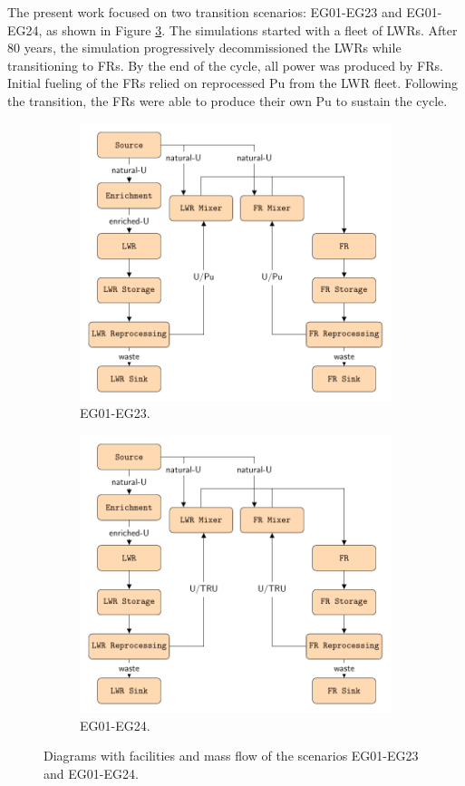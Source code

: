 \documentclass[11pt,letterpaper]{article}
\begin{document}
The present work focused on two transition scenarios: EG01-EG23 and EG01-EG24,  as shown in Figure \ref{fig:flow}. The simulations started with a fleet of LWRs. After 80 years, the simulation progressively decommissioned the LWRs while transitioning to FRs. By the end of the cycle, all power was produced by FRs. Initial fueling of the FRs relied on reprocessed Pu from the LWR fleet. Following the transition, the FRs were able to produce their own Pu to sustain the cycle.

\begin{figure}[]
	\centering
	\begin{subfigure}[t]{\textwidth}
		\centering
		\includegraphics[width=0.7\linewidth]{23flow.pdf} 
		\caption{EG01-EG23.}
		\label{fig:23flow}
	\end{subfigure}
	\vspace{1cm}
	\begin{subfigure}[t]{\textwidth}
		\centering
		\includegraphics[width=0.7\linewidth]{24flow.pdf} 
		\caption{EG01-EG24.}
		\label{fig:24flow}
	\end{subfigure}
	\hfill
	\caption{Diagrams with facilities and mass flow of the scenarios EG01-EG23 and EG01-EG24.}
	\label{fig:flow}
\end{figure}
\end{document}
